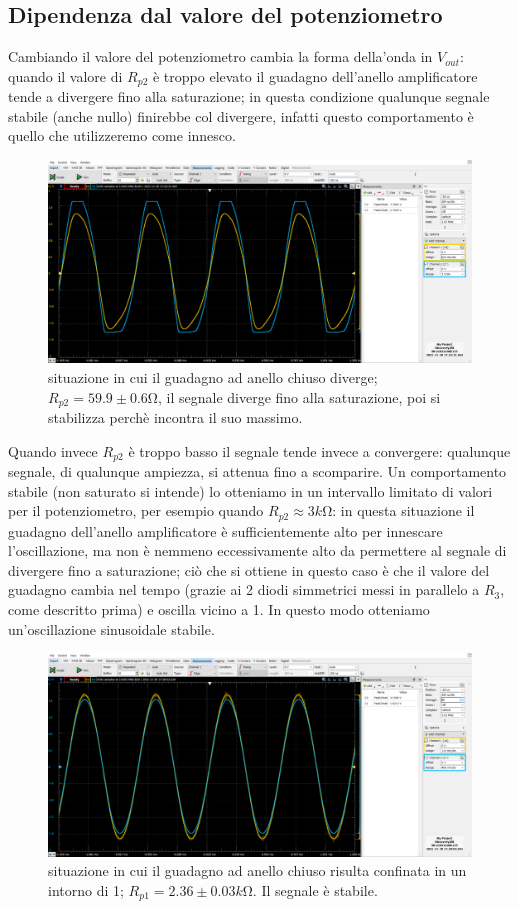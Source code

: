 \documentclass[10pt, a4paper, italian]{article}
\begin{document}
\subsection{Dipendenza dal valore del potenziometro}
Cambiando il valore del potenziometro cambia la forma della'onda in $V_{out}$: quando il valore di $R_{p2}$ è troppo elevato il guadagno dell'anello amplificatore tende a divergere fino alla saturazione; in questa condizione qualunque segnale stabile (anche nullo) finirebbe col divergere, infatti questo comportamento è quello che utilizzeremo come innesco.
\begin{figure}[H]
    \centering
	\includegraphics[scale=0.4]{4.60}
    \caption{situazione in cui il guadagno ad anello chiuso diverge; $R_{p2} =59.9 \pm 0.6 \si{\ohm}$, il segnale diverge fino alla saturazione, poi si stabilizza perchè incontra il suo massimo.
    \label{fig: Draft1}}
\end{figure}
Quando invece $R_{p2}$ è troppo basso il segnale tende invece a convergere: qualunque segnale, di qualunque ampiezza, si attenua fino a scomparire.
Un comportamento stabile (non saturato si intende) lo otteniamo in un intervallo limitato di valori per il potenziometro, per esempio quando $R_{p2} \approx 3 \si{k\ohm}$: in questa situazione il guadagno dell'anello amplificatore è sufficientemente alto per innescare l'oscillazione, ma non è nemmeno eccessivamente alto da permettere al segnale di divergere fino a saturazione; ciò che si ottiene in questo caso è che il valore del guadagno cambia nel tempo (grazie ai 2 diodi simmetrici messi in parallelo a $R_3$, come descritto prima) e oscilla vicino a 1. In questo modo otteniamo un'oscillazione sinusoidale stabile.
\begin{figure}[H]
    \centering
	\includegraphics[scale=0.4]{4.2360}
    \caption{situazione in cui il guadagno ad anello chiuso risulta confinata in un intorno di 1; $R_{p1} =2.36 \pm 0.03 \si{k\ohm}$. Il segnale è stabile.
    \label{fig: Draft1}}
\end{figure}
\end{document}
